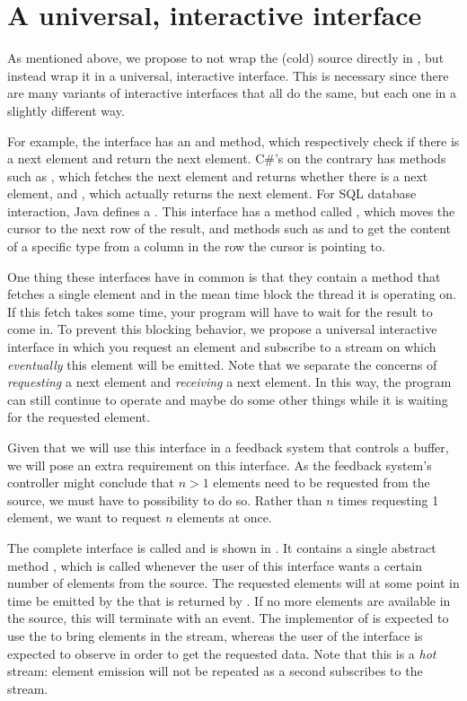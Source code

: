 \section{A universal, interactive interface}
As mentioned above, we propose to not wrap the (cold) source directly in , but instead wrap it in a universal, interactive interface. This is necessary since there are many variants of interactive interfaces that all do the same, but each one in a slightly different way.

For example, the \itr interface has an  and  method, which respectively check if there is a next element and return the next element. C\#'s \ier on the contrary has methods such as , which fetches the next element and returns whether there is a next element, and , which actually returns the next element. For SQL database interaction, Java defines a . This interface has a method called , which moves the cursor to the next row of the result, and methods such as  and  to get the content of a specific type from a column in the row the cursor is pointing to.

One thing these interfaces have in common is that they contain a method that fetches a single element and in the mean time block the thread it is operating on. If this fetch takes some time, your program will have to wait for the result to come in. To prevent this blocking behavior, we propose a universal interactive interface in which you request an element and subscribe to a stream on which \textit{eventually} this element will be emitted. Note that we separate the concerns of \textit{requesting} a next element and \textit{receiving} a next element. In this way, the program can still continue to operate and maybe do some other things while it is waiting for the requested element.

Given that we will use this interface in a feedback system that controls a buffer, we will pose an extra requirement on this interface. As the feedback system's controller might conclude that $n > 1$ elements need to be requested from the source, we must have to possibility to do so. Rather than $n$ times requesting 1 element, we want to request $n$ elements at once.

The complete interface is called  and is shown in . It contains a single abstract method , which is called whenever the user of this interface wants a certain number of elements from the source. The requested elements will at some point in time be emitted by the \obs that is returned by . If no more elements are available in the source, this \obs will terminate with an  event. The implementor of  is expected to use the  to bring elements in the stream, whereas the user of the interface is expected to observe  in order to get the requested data. Note that this is a \emph{hot} stream: element emission will not be repeated as a second \obv subscribes to the stream.

